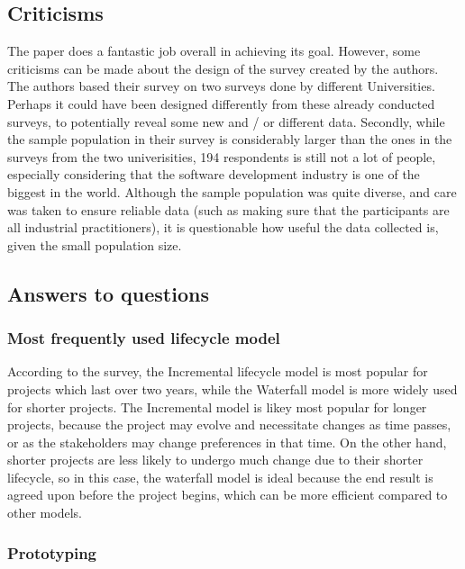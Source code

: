 \documentclass[letterpaper,12pt]{article}
\begin{document}
\subsection{Criticisms}
The paper does a fantastic job overall in achieving its goal. However, some criticisms
can be made about the design of the survey created by the authors.
The authors based their survey on two surveys done by different Universities.
Perhaps it could have been designed differently from these already conducted surveys,
to potentially reveal some new and / or different  data.  Secondly, while the
sample population in their survey is considerably larger than the ones in the surveys from the
two univerisities, 194 respondents is still not a lot of people, especially considering that the
software development industry is one of the biggest in the world. Although the
sample population was quite diverse, and care was taken to ensure reliable data (such as
making sure that the participants are all industrial practitioners), it is questionable
how useful the data collected is, given the small population size.


\subsection{Answers to questions}

\subsubsection{Most frequently used lifecycle model}

According to the survey, the Incremental lifecycle model is most popular for projects which last over
two years, while the Waterfall model is more widely used for shorter projects.
The Incremental model is likey most popular for longer projects, because
the project may evolve and necessitate changes as time passes, or as the
stakeholders may change preferences in that time. On the other hand,
shorter projects are less likely to undergo much change due to their shorter
lifecycle, so in this case, the waterfall model is ideal because the end result is
agreed upon before the project begins, which can be more efficient compared
to other models.


\subsubsection{Prototyping}
\end{document}
